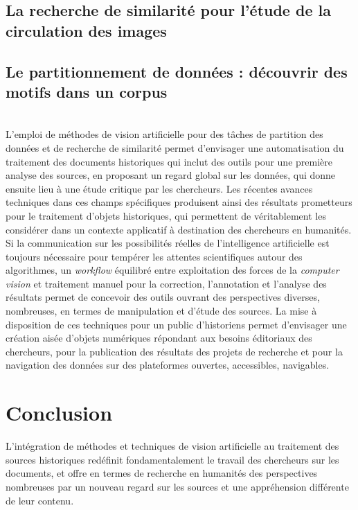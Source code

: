 \documentclass[a4paper,12pt,twoside]{book}
\newcommand{\cv}{\textit{computer vision}\xspace}
\newcommand{\ia}{intelligence artificielle\xspace}
\newcommand{\clearemptydoublepage}{\newpage{\pagestyle{empty}\cleardoublepage}}
\newcommand\chapterNo[1]{
  \chapter*{#1}
  \markright{\MakeUppercase{#1}}
}
\begin{document}
            \section[La recherche de similarité]{La recherche de similarité pour l'étude de la circulation des images}
				

       		\section[Le partitionnement de données]{Le partitionnement de données : découvrir des motifs dans un corpus}
       			
        	\\
        
        L'emploi de méthodes de vision artificielle pour des tâches de partition des données et de recherche de similarité permet d'envisager une automatisation du traitement des documents historiques qui inclut des outils pour une première analyse des sources, en proposant un regard global sur les données, qui donne ensuite lieu à une étude critique par les chercheurs. Les récentes avances techniques dans ces champs spécifiques produisent ainsi des résultats prometteurs pour le traitement d'objets historiques, qui permettent de véritablement les considérer dans un contexte applicatif à destination des chercheurs en humanités. Si la communication sur les possibilités réelles de l'\ia est toujours nécessaire pour tempérer les attentes scientifiques autour des algorithmes, un \textit{workflow} équilibré entre exploitation des forces de la \cv et traitement manuel pour la correction, l'annotation et l'analyse des résultats permet de concevoir des outils ouvrant des perspectives diverses, nombreuses, en termes de manipulation et d'étude des sources. La mise à disposition de ces techniques pour un public d'historiens permet d'envisager une création aisée d'objets numériques répondant aux besoins éditoriaux des chercheurs, pour la publication des résultats des projets de recherche et pour la navigation des données sur des plateformes ouvertes, accessibles, navigables. 
        \clearemptydoublepage
    
    \chapterNo{Conclusion}
	L'intégration de méthodes et techniques de vision artificielle au traitement des sources historiques redéfinit fondamentalement le travail des chercheurs sur les documents, et offre en termes de recherche en humanités des perspectives nombreuses par un nouveau regard sur les sources et une appréhension différente de leur contenu.
	
\end{document}
